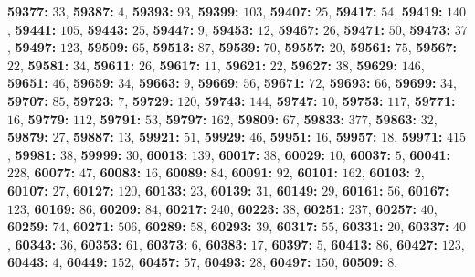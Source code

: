 \textsf{\bfseries 59377:} $33$, \textsf{\bfseries 59387:} $4$, \textsf{\bfseries 59393:} $93$, \textsf{\bfseries 59399:} $103$, \textsf{\bfseries 59407:} $25$, \textsf{\bfseries 59417:} $54$, \textsf{\bfseries 59419:} $140$, \textsf{\bfseries 59441:} $105$, \textsf{\bfseries 59443:} $25$, \textsf{\bfseries 59447:} $9$, \textsf{\bfseries 59453:} $12$, \textsf{\bfseries 59467:} $26$, \textsf{\bfseries 59471:} $50$, \textsf{\bfseries 59473:} $37$, \textsf{\bfseries 59497:} $123$, \textsf{\bfseries 59509:} $65$, \textsf{\bfseries 59513:} $87$, \textsf{\bfseries 59539:} $70$, \textsf{\bfseries 59557:} $20$, \textsf{\bfseries 59561:} $75$, \textsf{\bfseries 59567:} $22$, \textsf{\bfseries 59581:} $34$, \textsf{\bfseries 59611:} $26$, \textsf{\bfseries 59617:} $11$, \textsf{\bfseries 59621:} $22$, \textsf{\bfseries 59627:} $38$, \textsf{\bfseries 59629:} $146$, \textsf{\bfseries 59651:} $46$, \textsf{\bfseries 59659:} $34$, \textsf{\bfseries 59663:} $9$, \textsf{\bfseries 59669:} $56$, \textsf{\bfseries 59671:} $72$, \textsf{\bfseries 59693:} $66$, \textsf{\bfseries 59699:} $34$, \textsf{\bfseries 59707:} $85$, \textsf{\bfseries 59723:} $7$, \textsf{\bfseries 59729:} $120$, \textsf{\bfseries 59743:} $144$, \textsf{\bfseries 59747:} $10$, \textsf{\bfseries 59753:} $117$, \textsf{\bfseries 59771:} $16$, \textsf{\bfseries 59779:} $112$, \textsf{\bfseries 59791:} $53$, \textsf{\bfseries 59797:} $162$, \textsf{\bfseries 59809:} $67$, \textsf{\bfseries 59833:} $377$, \textsf{\bfseries 59863:} $32$, \textsf{\bfseries 59879:} $27$, \textsf{\bfseries 59887:} $13$, \textsf{\bfseries 59921:} $51$, \textsf{\bfseries 59929:} $46$, \textsf{\bfseries 59951:} $16$, \textsf{\bfseries 59957:} $18$, \textsf{\bfseries 59971:} $415$, \textsf{\bfseries 59981:} $38$, \textsf{\bfseries 59999:} $30$, \textsf{\bfseries 60013:} $139$, \textsf{\bfseries 60017:} $38$, \textsf{\bfseries 60029:} $10$, \textsf{\bfseries 60037:} $5$, \textsf{\bfseries 60041:} $228$, \textsf{\bfseries 60077:} $47$, \textsf{\bfseries 60083:} $16$, \textsf{\bfseries 60089:} $84$, \textsf{\bfseries 60091:} $92$, \textsf{\bfseries 60101:} $162$, \textsf{\bfseries 60103:} $2$, \textsf{\bfseries 60107:} $27$, \textsf{\bfseries 60127:} $120$, \textsf{\bfseries 60133:} $23$, \textsf{\bfseries 60139:} $31$, \textsf{\bfseries 60149:} $29$, \textsf{\bfseries 60161:} $56$, \textsf{\bfseries 60167:} $123$, \textsf{\bfseries 60169:} $86$, \textsf{\bfseries 60209:} $84$, \textsf{\bfseries 60217:} $240$, \textsf{\bfseries 60223:} $38$, \textsf{\bfseries 60251:} $237$, \textsf{\bfseries 60257:} $40$, \textsf{\bfseries 60259:} $74$, \textsf{\bfseries 60271:} $506$, \textsf{\bfseries 60289:} $58$, \textsf{\bfseries 60293:} $39$, \textsf{\bfseries 60317:} $55$, \textsf{\bfseries 60331:} $20$, \textsf{\bfseries 60337:} $40$, \textsf{\bfseries 60343:} $36$, \textsf{\bfseries 60353:} $61$, \textsf{\bfseries 60373:} $6$, \textsf{\bfseries 60383:} $17$, \textsf{\bfseries 60397:} $5$, \textsf{\bfseries 60413:} $86$, \textsf{\bfseries 60427:} $123$, \textsf{\bfseries 60443:} $4$, \textsf{\bfseries 60449:} $152$, \textsf{\bfseries 60457:} $57$, \textsf{\bfseries 60493:} $28$, \textsf{\bfseries 60497:} $150$, \textsf{\bfseries 60509:} $8$, 
